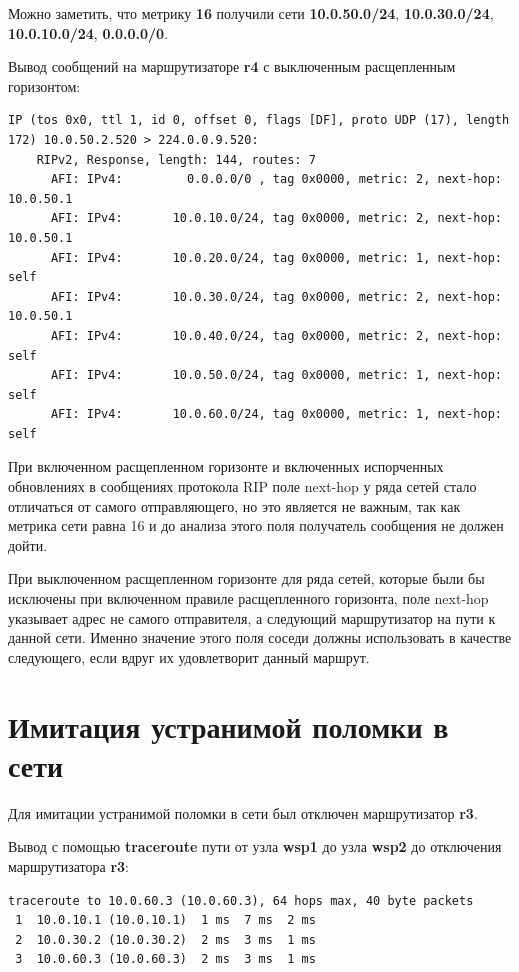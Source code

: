 \documentclass[a4paper,12pt]{article}
\begin{document}
Можно заметить, что метрику \textbf{16} получили сети \textbf{10.0.50.0/24}, \textbf{10.0.30.0/24}, \textbf{10.0.10.0/24}, \textbf{0.0.0.0/0}.

Вывод сообщений на маршрутизаторе \textbf{r4} с выключенным расщепленным горизонтом:

\begin{Verbatim}
IP (tos 0x0, ttl 1, id 0, offset 0, flags [DF], proto UDP (17), length 172) 10.0.50.2.520 > 224.0.0.9.520: 
	RIPv2, Response, length: 144, routes: 7
	  AFI: IPv4:         0.0.0.0/0 , tag 0x0000, metric: 2, next-hop: 10.0.50.1
	  AFI: IPv4:       10.0.10.0/24, tag 0x0000, metric: 2, next-hop: 10.0.50.1
	  AFI: IPv4:       10.0.20.0/24, tag 0x0000, metric: 1, next-hop: self
	  AFI: IPv4:       10.0.30.0/24, tag 0x0000, metric: 2, next-hop: 10.0.50.1
	  AFI: IPv4:       10.0.40.0/24, tag 0x0000, metric: 2, next-hop: self
	  AFI: IPv4:       10.0.50.0/24, tag 0x0000, metric: 1, next-hop: self
	  AFI: IPv4:       10.0.60.0/24, tag 0x0000, metric: 1, next-hop: self
\end{Verbatim}

При включенном расщепленном горизонте и включенных испорченных обновлениях в сообщениях протокола RIP поле next-hop у ряда сетей стало отличаться от самого отправляющего, но это является не важным, так как метрика сети равна 16 и до анализа этого поля получатель сообщения не должен дойти.

При выключенном расщепленном горизонте для ряда сетей, которые были бы исключены при включенном правиле расщепленного горизонта, поле next-hop указывает адрес не самого отправителя, а следующий маршрутизатор на пути к данной сети. Именно значение этого поля соседи должны использовать в качестве следующего, если вдруг их удовлетворит данный маршрут.

\section{Имитация устранимой поломки в сети}

Для имитации устранимой поломки в сети был отключен маршрутизатор \textbf{r3}.

Вывод с помощью \textbf{traceroute} пути от узла \textbf{wsp1} до узла \textbf{wsp2} до отключения маршрутизатора \textbf{r3}:

\begin{Verbatim}
traceroute to 10.0.60.3 (10.0.60.3), 64 hops max, 40 byte packets
 1  10.0.10.1 (10.0.10.1)  1 ms  7 ms  2 ms
 2  10.0.30.2 (10.0.30.2)  2 ms  3 ms  1 ms
 3  10.0.60.3 (10.0.60.3)  2 ms  3 ms  1 ms
\end{Verbatim}
\end{document}
